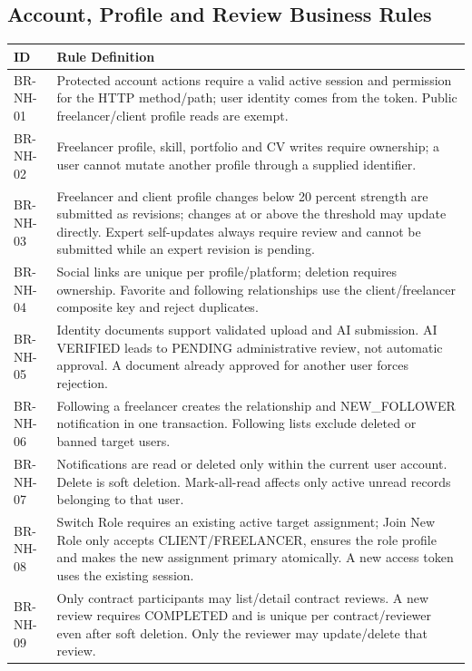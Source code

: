 \subsection{Account, Profile and Review Business Rules}
\begin{longtable}{|L{2.4cm}|L{11.8cm}|}\hline
ID & Rule Definition \\ \hline
BR-NH-01 & Protected account actions require a valid active session and permission for the HTTP method/path; user identity comes from the token. Public freelancer/client profile reads are exempt. \\ \hline
BR-NH-02 & Freelancer profile, skill, portfolio and CV writes require ownership; a user cannot mutate another profile through a supplied identifier. \\ \hline
BR-NH-03 & Freelancer and client profile changes below 20 percent strength are submitted as revisions; changes at or above the threshold may update directly. Expert self-updates always require review and cannot be submitted while an expert revision is pending. \\ \hline
BR-NH-04 & Social links are unique per profile/platform; deletion requires ownership. Favorite and following relationships use the client/freelancer composite key and reject duplicates. \\ \hline
BR-NH-05 & Identity documents support validated upload and AI submission. AI VERIFIED leads to PENDING administrative review, not automatic approval. A document already approved for another user forces rejection. \\ \hline
BR-NH-06 & Following a freelancer creates the relationship and NEW_FOLLOWER notification in one transaction. Following lists exclude deleted or banned target users. \\ \hline
BR-NH-07 & Notifications are read or deleted only within the current user account. Delete is soft deletion. Mark-all-read affects only active unread records belonging to that user. \\ \hline
BR-NH-08 & Switch Role requires an existing active target assignment; Join New Role only accepts CLIENT/FREELANCER, ensures the role profile and makes the new assignment primary atomically. A new access token uses the existing session. \\ \hline
BR-NH-09 & Only contract participants may list/detail contract reviews. A new review requires COMPLETED and is unique per contract/reviewer even after soft deletion. Only the reviewer may update/delete that review. \\ \hline

\end{longtable}
